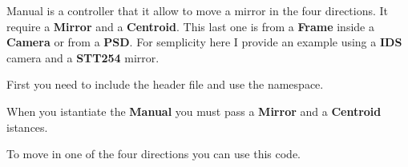 Manual is a controller that it allow to move a mirror in the four
directions. It require a \textbf{Mirror} and a \textbf{Centroid}. This
last one is from a \textbf{Frame} inside a \textbf{Camera} or from a
\textbf{PSD}. For semplicity here I provide an example using a
\textbf{IDS} camera and a \textbf{STT254} mirror.

First you need to include the header file and use the namespace.

\begin{Shaded}
\begin{Highlighting}[]
 
 
 
\end{Highlighting}
\end{Shaded}

When you istantiate the \textbf{Manual} you must pass a \textbf{Mirror}
and a \textbf{Centroid} istances.

\begin{Shaded}
\begin{Highlighting}[]
\end{Highlighting}
\end{Shaded}

To move in one of the four directions you can use this code.

\begin{Shaded}
\begin{Highlighting}[]
\end{Highlighting}
\end{Shaded}

